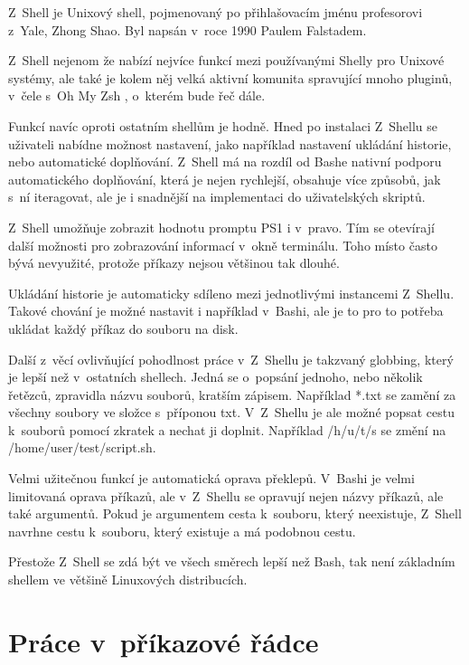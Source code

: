 \documentclass[thesis=M,czech]{FITthesis}[2012/06/26]
\begin{document}
Z~Shell \cite{zsh} je Unixový shell, pojmenovaný po přihlašovacím jménu profesorovi z~Yale, Zhong Shao. Byl napsán v~roce 1990 Paulem Falstadem.

Z~Shell nejenom že nabízí nejvíce funkcí mezi používanými Shelly pro Unixové systémy, ale také je kolem něj velká aktivní komunita spravující mnoho pluginů, v~čele s~Oh My Zsh \cite{ohmyzsh}, o~kterém bude řeč dále.

Funkcí navíc oproti ostatním shellům je hodně. Hned po instalaci Z~Shellu se uživateli nabídne možnost nastavení, jako například nastavení ukládání historie, nebo automatické doplňování. Z~Shell má na rozdíl od Bashe nativní podporu automatického doplňování, která je nejen rychlejší, obsahuje více způsobů, jak s~ní iteragovat, ale je i snadnější na implementaci do uživatelských skriptů.

Z~Shell umožňuje zobrazit hodnotu promptu PS1 i v~pravo. Tím se otevírají další možnosti pro zobrazování informací v~okně terminálu. Toho místo často bývá nevyužité, protože příkazy nejsou většinou tak dlouhé.

Ukládání historie je automaticky sdíleno mezi jednotlivými instancemi Z~Shellu. Takové chování je možné nastavit i například v~Bashi, ale je to pro to potřeba ukládat každý příkaz do souboru na disk.

Další z~věcí ovlivňující pohodlnost práce v~Z~Shellu je takzvaný globbing, který je lepší než v~ostatních shellech. Jedná se o~popsání jednoho, nebo několik řetězců, zpravidla názvu souborů, kratším zápisem. Například *.txt se zamění za všechny soubory ve složce s~příponou txt. V~Z~Shellu je ale možné popsat cestu k~souborů pomocí zkratek a nechat ji doplnit. Například /h/u/t/s se změní na /home/user/test/script.sh.

Velmi užitečnou funkcí je automatická oprava překlepů. V~Bashi je velmi limitovaná oprava příkazů, ale v~Z~Shellu se opravují nejen názvy příkazů, ale také argumentů. Pokud je argumentem cesta k~souboru, který neexistuje, Z~Shell navrhne cestu k~souboru, který existuje a má podobnou cestu.

Přestože Z~Shell se zdá být ve všech směrech lepší než Bash, tak není základním shellem ve většině Linuxových distribucích.


%
%
%
\section{Práce v~příkazové řádce}
\end{document}
